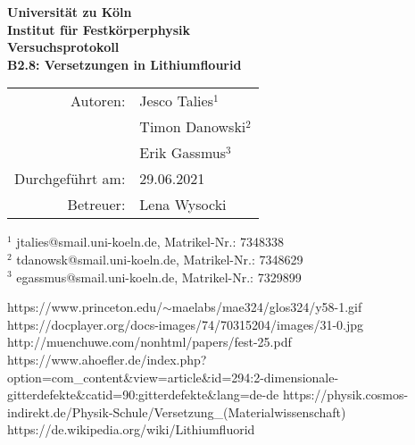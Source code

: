 ﻿\documentclass{article}
\begin{document}
 
 
\thispagestyle{empty}
\vspace*{\fill}
\begin{center}
	\Huge
	\textbf{Universität zu Köln}\\
	\LARGE
	\textbf{Institut für Festkörperphysik}\\
	\vspace{2cm}
	\textbf{Versuchsprotokoll}\\  
	\vspace{0.5cm}
	\large
	\textbf{B2.8: Versetzungen in Lithiumflourid}\\
	\normalsize
	\vspace{2cm}
	\begin{tabular}{r l}
		Autoren: 	& Jesco Talies$^1$\\
					& Timon Danowski$^2$\\
                    & Erik Gassmus$^3$\\
		Durchgeführt am:	& 29.06.2021\\
		Betreuer:	& Lena Wysocki
	\end{tabular}
\end{center}
\vfill\footnotesize
$^1$ jtalies@smail.uni-koeln.de, Matrikel-Nr.:  7348338\\
$^2$ tdanowsk@smail.uni-koeln.de, Matrikel-Nr.: 7348629\\
$^3$ egassmus@smail.uni-koeln.de, Matrikel-Nr.: 7329899\\
\normalsize

\newpage
\thispagestyle{empty}
\tableofcontents
\clearpage
\setcounter{page}{1}
  
   
  

%
% 





\begin{thebibliography}{9}
		https://www.princeton.edu/$\sim$maelabs/mae324/glos324/y58-1.gif
		https://docplayer.org/docs-images/74/70315204/images/31-0.jpg
		http://muenchuwe.com/nonhtml/papers/fest-25.pdf
		https://www.ahoefler.de/index.php?option=com\_content\&view=article\&id=294:2-dimensionale-gitterdefekte\&catid=90:gitterdefekte\&lang=de-de
		https://physik.cosmos-indirekt.de/Physik-Schule/Versetzung\_(Materialwissenschaft)
		https://de.wikipedia.org/wiki/Lithiumfluorid
\end{thebibliography}
\end{document}
